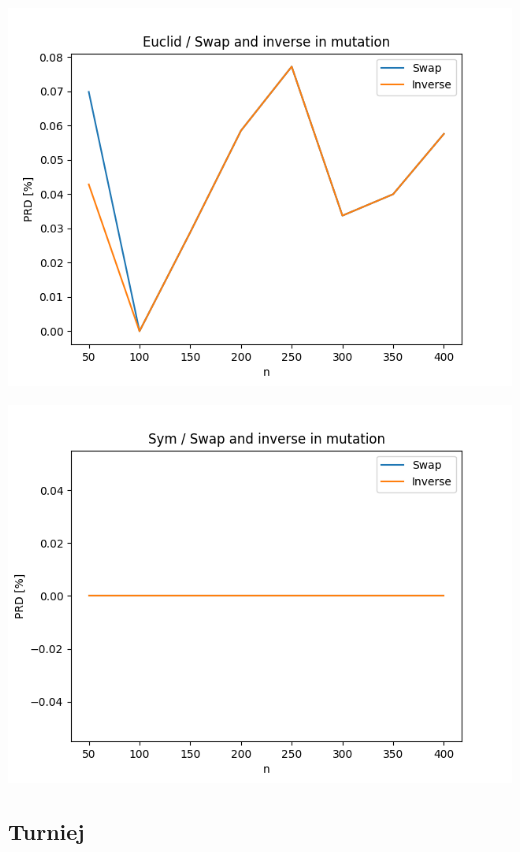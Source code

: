 \documentclass{article}
\begin{document}
\begin{center}
\includegraphics[width=\textwidth, 
                   height = 0.4\textheight, 
                   keepaspectratio]
                  {plots/euclid_6_swap_inverse} 
\end{center}

\begin{center}
\includegraphics[width=\textwidth, 
                   height = 0.4\textheight, 
                   keepaspectratio]
                  {plots/sym_6_swap_inverse} 
\end{center}


\subsection{Turniej}
\end{document}
